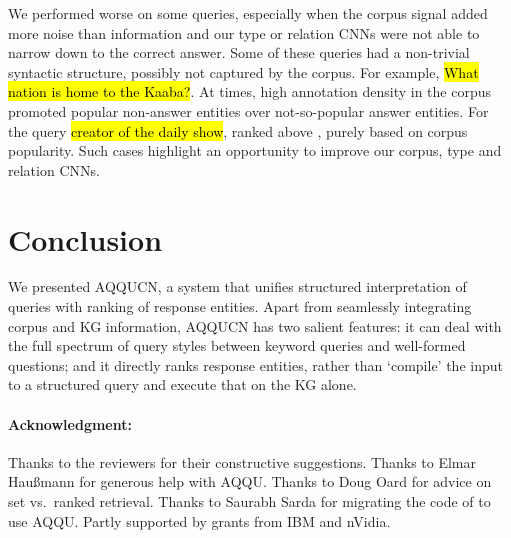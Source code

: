 \documentclass{svjour3}
\DeclareRobustCommand{\query}[1]{{\sethlcolor{qcolor}\sffamily\hl{#1}}}
\begin{document}
We performed worse on some queries, especially when the corpus signal added more noise than information and our type or relation CNNs were not able to narrow down to the correct answer. Some of these queries had a non-trivial syntactic structure, possibly not captured by the corpus. For example, \query{What nation is home to the Kaaba?}.  At times, high annotation density in the corpus promoted popular non-answer entities over not-so-popular answer entities.  For the query \query{creator of the daily show},  ranked above , purely based on corpus popularity.  Such cases highlight an opportunity to improve our corpus, type and relation CNNs.





\section{Conclusion}
\label{sec:End}

We presented AQQUCN, a system that unifies structured interpretation of queries with ranking of response entities.  Apart from seamlessly integrating corpus and KG information, AQQUCN has two salient features: it can deal with the full spectrum of query styles between keyword queries and well-formed questions; and it directly ranks response entities, rather than `compile' the input to a structured query and execute that on the KG alone.

\smallskip
\paragraph*{Acknowledgment:}
Thanks to the reviewers for their constructive suggestions. Thanks to Elmar Hau{\ss}mann for generous help with AQQU. Thanks to Doug Oard for advice on set vs.\ ranked retrieval. Thanks to Saurabh Sarda for migrating the code of \citet{JoshiSC2014KgCorpusJoint} to use AQQU.  Partly supported by grants from IBM and nVidia.



\begin{small}
  
\end{small}
\end{document}
